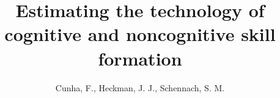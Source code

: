 
\title{Estimating the technology of cognitive and noncognitive skill formation}
\author{Cunha, F., Heckman, J. J., Schennach, S. M.}
\date{}

\let\otp\titlepage
